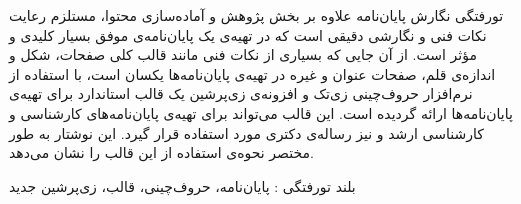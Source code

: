 


\pagestyle{empty}

‌تورفتگی
نگارش پایان‌نامه‌ علاوه بر بخش پژوهش و آماده‌سازی محتوا،
مستلزم رعایت نکات فنی و نگارشی دقیقی است 
که در تهیه‌ی یک پایان‌نامه‌ی موفق بسیار کلیدی و مؤثر است.
از آن جایی که بسیاری از نکات فنی مانند قالب کلی صفحات، شکل و اندازه‌ی قلم، 
صفحات عنوان و غیره در تهیه‌ی پایان‌نامه‌ها یکسان است،
با استفاده از نرم‌افزار حروف‌چینی زی‌تک %
و افزونه‌ی زی‌پرشین %
یک قالب استاندارد برای تهیه‌ی پایان‌نامه‌ها ارائه گردیده است.
این قالب می‌تواند برای تهیه‌ی پایان‌نامه‌های
کارشناسی و کارشناسی ارشد و نیز رساله‌ی دکتری مورد استفاده قرار گیرد.
این نوشتار به طور مختصر نحوه‌ی استفاده از این قالب را نشان می‌دهد.

‌بلند
‌تورفتگی : 
پایان‌نامه، حروف‌چینی، قالب، زی‌پرشین
‌جدید
